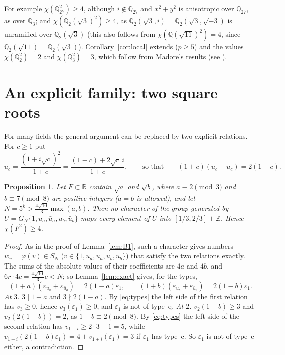 \documentclass[11pt,a4paper]{amsart}
\newtheorem{proposition}{Proposition}
\theoremstyle{remark}
\newcommand{\Q}{\mathbb{Q}}
\newcommand{\R}{\mathbb{R}}
\newcommand{\Z}{\mathbb{Z}}
\begin{document}
For example $\chi(\Q_{27}^2)\ge4$, although $i\notin\Q_{27}$ and $x^2+y^2$ is anisotropic over $\Q_{27}$, as over
$\Q_3$; and $\chi(\Q_2(\sqrt3)^2)\ge4$, as $\Q_2(\sqrt3,i)=\Q_2(\sqrt3,\sqrt{-3})$ is unramified over
$\Q_2(\sqrt3)$ (this also follows from $\chi(\Q(\sqrt{11})^2)=4$, since $\Q_2(\sqrt{11})=\Q_2(\sqrt3)$).
Corollary~\ref{cor:local} extends \cite[Corollary~3]{FC} ($p\ge5$) and the values $\chi(\Q_2^2)=2$ and
$\chi(\Q_3^2)=3$, which follow from Madore's results \cite{Madore} (see \cite[Theorem~2]{PP}).

\section{An explicit family: two square roots}\label{sec:two}

For many fields the general argument can be replaced by two explicit relations. For $c\ge1$ put
\[
u_c=\frac{(1+i\sqrt c)^2}{1+c}=\frac{(1-c)+2\sqrt c\,i}{1+c},\qquad\text{so that}\qquad(1+c)(u_c+\bar u_c)=2(1-c).
\]

\begin{proposition}\label{prop:two}
Let $F\subset\R$ contain $\sqrt a$ and $\sqrt b$, where $a\equiv2\pmod3$ and $b\equiv7\pmod8$ are positive integers
\textup{(}$a=b$ is allowed\textup{)}, and let $N=5^k>\frac{4\sqrt{10}}3\max(a,b)$. Then no character of the group
generated by $U=G_N\{1,u_a,\bar u_a,u_b,\bar u_b\}$ maps every element of $U$ into $[1/3,2/3]+\Z$. Hence
$\chi(F^2)\ge4$.
\end{proposition}

\begin{proof}
As in the proof of Lemma~\ref{lem:B1}, such a character gives numbers $w_v=\varphi(v)\in S_N$
($v\in\{1,u_a,\bar u_a,u_b,\bar u_b\}$) that satisfy the two relations exactly. The sums of the absolute values of
their coefficients are $4a$ and $4b$, and $6r\cdot4c=\frac{4\sqrt{10}}3c<N$; so Lemma~\ref{lem:exact} gives, for the
types,
\[
(1+a)(\varepsilon_{u_a}+\varepsilon_{\bar u_a})=2(1-a)\varepsilon_1,\qquad(1+b)(\varepsilon_{u_b}+\varepsilon_{\bar u_b})=2(1-b)\varepsilon_1.
\]
\emph{At $3$.} $3\mid1+a$ and $3\nmid2(1-a)$. By \eqref{eq:types} the left side of the first relation has
$v_3\ge0$, hence $v_3(\varepsilon_1)\ge0$, and $\varepsilon_1$ is not of type~q.
\emph{At $2$.} $v_2(1+b)\ge3$ and $v_2(2(1-b))=2$, as $1-b\equiv2\pmod8$. By \eqref{eq:types} the left side of the
second relation has $v_{1+i}\ge2\cdot3-1=5$, while $v_{1+i}(2(1-b)\varepsilon_1)=4+v_{1+i}(\varepsilon_1)=3$ if
$\varepsilon_1$ has type~c. So $\varepsilon_1$ is not of type~c either, a contradiction.
\end{proof}
\end{document}
